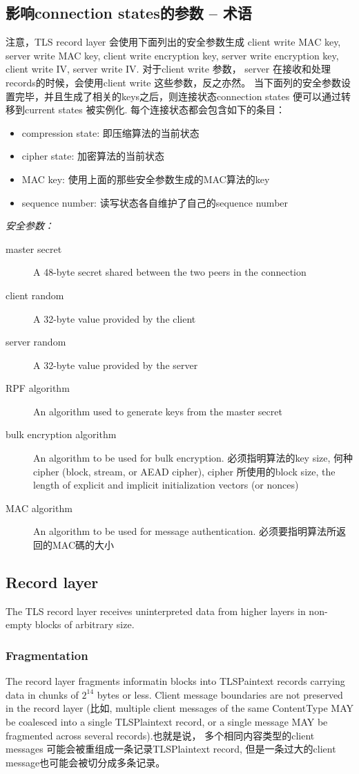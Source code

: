 \documentclass[a4paper]{ctexart}
\begin{document}
\subsection{影响connection states的参数 -- 术语}
注意，TLS record layer 会使用下面列出的安全参数生成
 client write MAC key, server write MAC key, 
 client write encryption key, server write encryption key, 
 client write IV, server write IV. 对于client write 参数， server 在接收和处理records的时候，会使用client write 这些参数，反之亦然。
当下面列的安全参数设置完毕，并且生成了相关的keys之后，则连接状态connection states 便可以通过转移到current states 被实例化. 
每个连接状态都会包含如下的条目：
\begin{itemize}
  \item compression state: 即压缩算法的当前状态
  \item cipher state: 加密算法的当前状态
  \item MAC key: 使用上面的那些安全参数生成的MAC算法的key
  \item sequence number: 读写状态各自维护了自己的sequence number
\end{itemize}
\emph{安全参数：}
\begin{description}
  \item[master secret]A 48-byte secret shared between the two peers in the connection
  \item[client random]A 32-byte value provided by the client
  \item[server random]A 32-byte value provided by the server
  \item[RPF algorithm]An algorithm used to generate keys from the master secret
  \item[bulk encryption algorithm]An algorithm to be used for bulk encryption. 必须指明算法的key size, 何种cipher (block, stream, or AEAD cipher), 
    cipher 所使用的block size, the length of explicit and implicit initialization vectors (or nonces)
  \item[MAC algorithm]An algorithm to be used for message authentication. 必须要指明算法所返回的MAC碼的大小
\end{description}


\subsection{Record layer}
The TLS record layer receives uninterpreted data from higher layers in non-empty blocks of arbitrary size.

\subsubsection{Fragmentation}
The record layer fragments informatin blocks into TLSPaintext records carrying data in chunks of $2^14$ bytes or less. 
Client message boundaries are not preserved in the record layer (比如, multiple client messages of the same ContentType MAY be
coalesced into a single TLSPlaintext record, or a single message MAY be fragmented across several records).也就是说，
多个相同内容类型的client messages 可能会被重组成一条记录TLSPlaintext record, 但是一条过大的client message也可能会被切分成多条记录。
\end{document}
